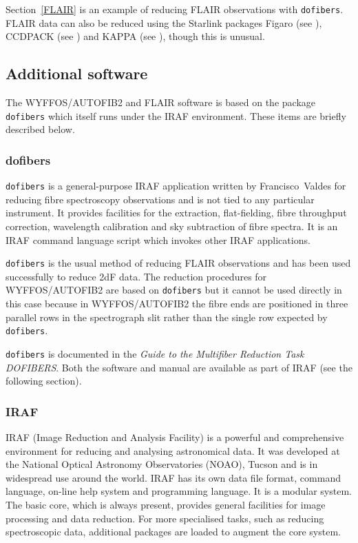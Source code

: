\documentclass[chapters,twoside,11pt]{starlink}
\begin{document}
Section~\ref{FLAIR} is an example of reducing FLAIR observations with \texttt{dofibers}.  FLAIR data can also be reduced using the Starlink packages
Figaro (see \cite{SUN86}),
CCDPACK (see \cite{SUN139}) and
KAPPA (see \cite{SUN95}),
though this is unusual.

\subsection{Additional software}

The WYFFOS/AUTOFIB2 and FLAIR software is based on the package \texttt{dofibers} which itself runs under the IRAF environment.  These items
are briefly described below.

\subsubsection{\label{DOFIBERS}dofibers}

\texttt{dofibers} is a general-purpose IRAF application written by
Francisco~Valdes for reducing fibre spectroscopy observations and
is not tied to any particular instrument.  It provides facilities for
the extraction, flat-fielding, fibre throughput correction, wavelength
calibration and sky subtraction of fibre spectra.  It is an IRAF
command language script which invokes other IRAF applications.

\texttt{dofibers} is the usual method of reducing FLAIR observations and
has been used successfully to reduce 2dF data.  The reduction procedures
for WYFFOS/AUTOFIB2 are based on \texttt{dofibers} but it cannot be used
directly in this case because in WYFFOS/AUTOFIB2 the fibre ends are
positioned in three parallel rows in the spectrograph slit rather than
the single row expected by \texttt{dofibers}.

\texttt{dofibers} is documented in the \textit{Guide to the Multifiber
Reduction Task DOFIBERS}\/\cite{VALDES92A}.  Both the software and manual
are available as part of IRAF (see the following section).

\subsubsection{\label{IRAF}IRAF}

IRAF (Image Reduction and Analysis Facility) is a powerful and
comprehensive environment for reducing and analysing astronomical
data.  It was developed at the National Optical Astronomy Observatories
(NOAO), Tucson and is in widespread use around the world.  IRAF has
its own data file format, command language, on-line help system and
programming language.  It is a modular system.  The basic core, which
is always present, provides general facilities for image processing
and data reduction.  For more specialised tasks, such as reducing
spectroscopic data, additional packages are loaded to augment the
core system.
\end{document}
